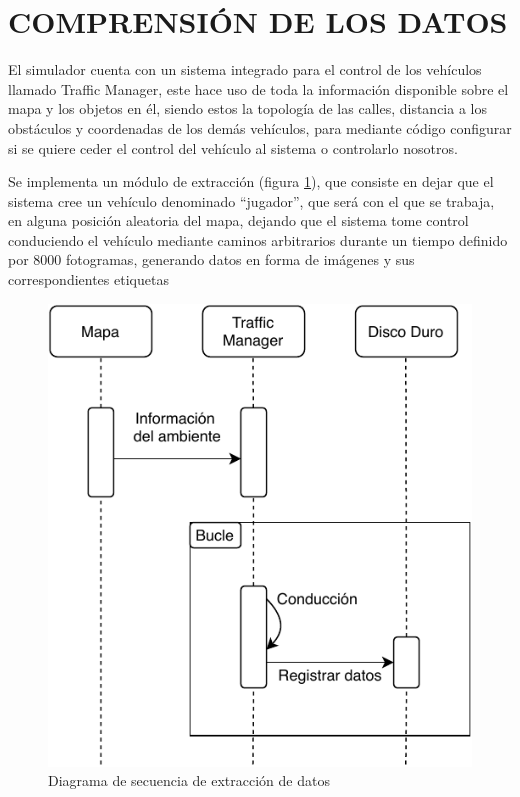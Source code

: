 \section{COMPRENSIÓN DE LOS DATOS}
El simulador cuenta con un sistema integrado para el control de los vehículos llamado Traffic Manager, este hace uso de toda la información disponible sobre el mapa y los objetos en él, siendo estos la topología de las calles, distancia a los obstáculos y coordenadas de los demás vehículos, para mediante código configurar si se quiere ceder el control del vehículo al sistema o controlarlo nosotros.

Se implementa un módulo de extracción (figura \ref{extraccion}), que consiste en dejar que el sistema cree un vehículo denominado ``jugador'', que será con el que se trabaja, en alguna posición aleatoria del mapa, dejando que el sistema tome control conduciendo el vehículo mediante caminos arbitrarios durante un tiempo definido por 8000 fotogramas, generando datos en forma de imágenes y sus correspondientes etiquetas

\begin{figure}[H]
	\centering
	\includegraphics[scale=0.9]{imagenes/arquitectura-extraccion}
	\caption[Diagrama de secuencia de extracción de datos]{Diagrama de secuencia de extracción de datos}
	\label{extraccion}
\end{figure}

